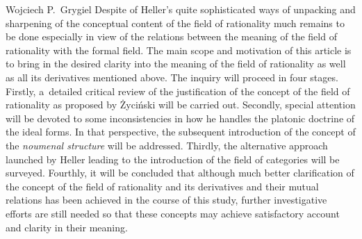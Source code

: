 \begin{artengenv}{Wojciech P.~Grygiel}
Despite of Heller's quite sophisticated ways of unpacking and sharpening of the conceptual content of the field of rationality much remains to be done especially in view of the relations between the meaning of the field of rationality with the formal field. The main scope and motivation of this article is to bring in the desired clarity into the meaning of the field of rationality as well as all its derivatives mentioned above. The inquiry will proceed in four stages. Firstly, a~detailed critical review of the justification of the concept of the field of rationality as proposed by Życiński will be carried out. Secondly, special attention will be devoted to some inconsistencies in how he handles the platonic doctrine of the ideal forms. In that perspective, the subsequent introduction of the concept of the \textit{noumenal structure} will be addressed. Thirdly, the alternative approach launched by Heller leading to the introduction of the field of categories will be surveyed. Fourthly, it will be concluded that although much better clarification of the concept of the field of rationality and its derivatives and their mutual relations has been achieved in the course of this study, further investigative efforts are still needed so that these concepts may achieve satisfactory account and clarity in their meaning.


\end{artengenv}
